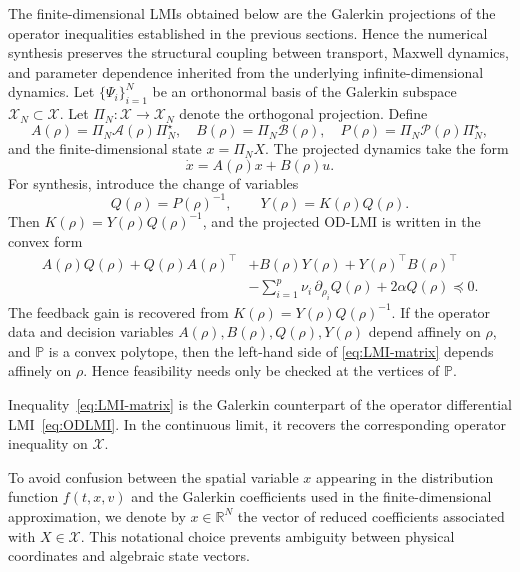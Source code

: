 \documentclass[AMA,Times2COL]{WileyNJDv5}
\begin{document}
The finite-dimensional LMIs obtained below are the Galerkin
projections of the operator inequalities established in the previous sections. Hence the numerical synthesis preserves the structural coupling between transport, Maxwell dynamics, and parameter dependence inherited
from the underlying infinite-dimensional dynamics. Let
$\{\Psi_i\}_{i=1}^N$ be an orthonormal basis of the Galerkin subspace
$\mathscr X_N\subset\mathscr X$.
Let $\Pi_N:\mathscr X\to\mathscr X_N$ denote the orthogonal projection. Define
\[
A(\rho)=\Pi_N\mathcal{A}(\rho)\Pi_N^{\star},\quad
B(\rho)=\Pi_N\mathcal{B}(\rho),\quad
P(\rho)=\Pi_N\mathcal{P}(\rho)\Pi_N^{\star},
\]
and the finite-dimensional state $x=\Pi_N X$.  
The projected dynamics take the form
\[
\dot{x} = A(\rho)x + B(\rho)u .
\]
For synthesis, introduce the change of variables
\[
Q(\rho)=P(\rho)^{-1},
\qquad
Y(\rho)=K(\rho)Q(\rho).
\]
Then \(K(\rho)=Y(\rho)Q(\rho)^{-1}\), and the projected OD-LMI is written in the convex form
\begin{align}\label{eq:LMI-matrix}
A(\rho)Q(\rho)
+
Q(\rho)A(\rho)^{\top}
&+
B(\rho)Y(\rho)
+
Y(\rho)^{\top}B(\rho)^{\top}\nonumber\\
&-
\sum_{i=1}^{p}\nu_i\,\partial_{\rho_i}Q(\rho)
+
2\alpha Q(\rho)
\preceq
0 .
\end{align}
The feedback gain is recovered from
\(
K(\rho)=Y(\rho)Q(\rho)^{-1}.
\)
If the operator data and decision variables
$A(\rho),B(\rho),Q(\rho),Y(\rho)$ depend affinely on $\rho$, and $\mathbb P$ is a convex polytope, then the left-hand side of \eqref{eq:LMI-matrix} depends affinely on $\rho$.
Hence feasibility needs only be checked at the vertices of $\mathbb P$.

\begin{remark}
Inequality~\eqref{eq:LMI-matrix} is the Galerkin counterpart of the operator differential LMI~\eqref{eq:ODLMI}. In the continuous limit, it recovers the corresponding operator inequality on $\mathscr X$.
\end{remark}

\begin{remark}
To avoid confusion between the spatial variable $x$ appearing in the distribution function $f(t,x,v)$ and the Galerkin coefficients used in the finite-dimensional approximation, we denote by $x\in\mathbb{R}^{N}$ the vector
of reduced coefficients associated with $X\in\mathscr{X}$.
This notational choice prevents ambiguity between physical coordinates and algebraic state vectors.
\end{remark}
\end{document}
